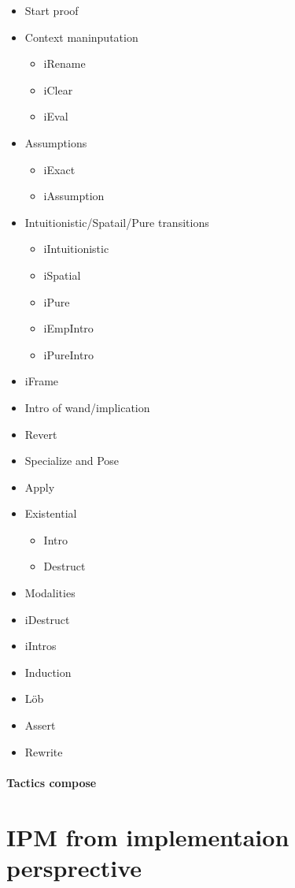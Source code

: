 \begin{itemize}
\item Start proof
\item Context maninputation
  \begin{itemize}
  \item iRename
  \item iClear
  \item iEval
  \end{itemize}
\item Assumptions
  \begin{itemize}
  \item iExact
  \item iAssumption
  \end{itemize}
\item Intuitionistic/Spatail/Pure transitions
  \begin{itemize}
  \item iIntuitionistic
  \item iSpatial
  \item iPure
  \item iEmpIntro
  \item iPureIntro
  \end{itemize}
\item iFrame
\item Intro of wand/implication
\item Revert
\item Specialize and Pose
\item Apply
\item Existential
  \begin{itemize}
  \item Intro
  \item Destruct
  \end{itemize}
\item Modalities
\item iDestruct
\item iIntros
\item Induction
\item Löb
\item Assert
\item Rewrite
\end{itemize}

\paragraph{Tactics compose}

\section{IPM from implementaion persprective}

